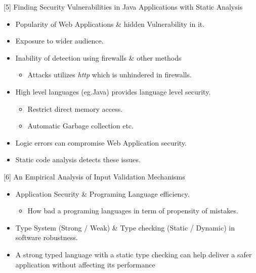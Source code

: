 \documentclass[xcolor=x11names,compress]{beamer}
\renewcommand{\(}{\begin{columns}}
\renewcommand{\)}{\end{columns}}
\newcommand{\<}[1]{\begin{column}{#1}}
\renewcommand{\>}{\end{column}}
\begin{document}
\begin{frame}{[5] Finding Security Vulnerabilities in Java Applications with
		Static Analysis}
	\begin{itemize}
		\item Popularity of Web Applications \& hidden Vulnerability in it.
		\item Exposure to wider audience.
		\item Inability of detection using firewalls \& other methods
		\begin{itemize}
			\item Attacks utilizes \textit{http} which is unhindered in firewalls.
		\end{itemize}
		\item High level languages (eg.Java) provides language level security.
		\begin{itemize}
			\item Restrict direct memory access.
			\item Automatic Garbage collection etc.
		\end{itemize}
		\item Logic errors can compromise Web Application security.
		\item Static code analysis detects these issues. 
	\end{itemize}
\end{frame}

\begin{frame}{[6] An Empirical Analysis of Input Validation Mechanisms}
	\begin{itemize}
		\item Application Security \& Programing Language efficiency.
		\newline
		\begin{itemize}
			\item How bad a programing languages in term of propensity of mistakes.\newline
		\end{itemize}
		\item Type System (Strong / Weak) \& Type checking (Static / Dynamic) in software robustness.
		\newline
		\item A strong typed language with a
		static type checking can help deliver a safer application without affecting its performance
	\end{itemize}
\end{frame}
\end{document}
